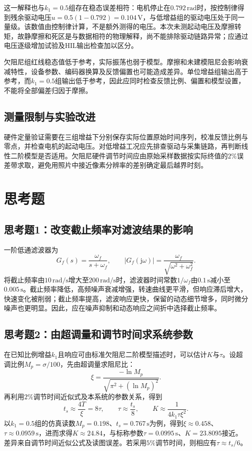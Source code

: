 \documentclass[12pt]{article}
\newcommand{\unit}[1]{\,\mathrm{#1}}
\begin{document}
这一解释也与$k_1=0.5$组存在稳态误差相符：电机停止在$0.792\unit{rad}$时，按控制律得到残余驱动电压$u=0.5(1-0.792)=0.104\unit{V}$，与低增益组的驱动电压处于同一量级。该数值由控制律计算，不是额外测得的电压。本次未测起动电压及摩擦转矩，故静摩擦和死区是与数据相符的物理解释，尚不能排除驱动链路异常；应通过电压逐级增加试验及HIL输出检查加以区分。

欠阻尼组红线稳态值低于参考，实际振荡也弱于模型。摩擦和未建模阻尼会影响衰减特性，设备参数、编码器换算及反馈偏置也可能造成差异。单位增益组输出高于参考，而$k_1=0.5$组输出低于参考，因此应同时检查反馈比例、偏置和模型设置，不能将全部偏差归因于摩擦。

\subsection{测量限制与实验改进}
硬件定量验证需要在三组增益下分别保存实际位置原始时间序列，校准反馈比例与零点，并检查电机的起动电压。对低增益工况应先排查驱动与采集链路，再判断线性二阶模型是否适用。欠阻尼硬件调节时间应由原始采样数据按实际终值的$2\%$误差带求取，避免用照片中接近像素分辨率的差别确定最后越界时刻。

\section{思考题}
\subsection{思考题1：改变截止频率对滤波结果的影响}
一阶低通滤波器为
\begin{equation}
 G_f(s)=\frac{\omega_f}{s+\omega_f},\qquad
 |G_f(\mathrm j\omega)|=\frac{\omega_f}{\sqrt{\omega^2+\omega_f^2}}.
\end{equation}
将截止频率由$10\unit{rad/s}$增大至$200\unit{rad/s}$时，滤波器时间常数$1/\omega_f$由$0.1\unit{s}$减小至$0.005\unit{s}$。截止频率降低，高频噪声衰减增强，转速曲线更平滑，但响应滞后增大，快速变化被削弱；截止频率提高，滤波响应更快，保留的动态细节增多，同时微分噪声也更明显。因此，应在噪声抑制和动态响应之间折中选择截止频率。

\subsection{思考题2：由超调量和调节时间求系统参数}
在已知比例增益$k_1$且响应可由标准欠阻尼二阶模型描述时，可以估计$K$与$\tau$。设超调比例$M_p=\sigma/100$，先由超调量求阻尼比：
\begin{equation}
 \xi=\frac{-\ln M_p}{\sqrt{\pi^2+(\ln M_p)^2}}.
\end{equation}
再利用$2\%$调节时间近似式及本系统的参数关系，得到
\begin{equation}
 t_s\approx\frac{4T}{\xi}=8\tau,\qquad
 \tau\approx\frac{t_s}{8},\qquad
 K\approx\frac{1}{4k_1\tau\xi^2}.
\end{equation}
以$k_1=0.5$组的仿真读数$M_p=0.198$、$t_s=0.767\unit{s}$为例，得到$\xi\approx0.458$、$\tau\approx0.0959\unit{s}$，进而求得$K\approx24.84$，与标称参数$\tau=0.0995\unit{s}$、$K=23.8095$接近。差异来自调节时间近似公式及读图误差。若采用$5\%$调节时间，则相应有$\tau\approx t_s/6$。
\end{document}
